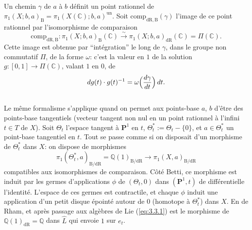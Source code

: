 \documentclass[11pt,a4paper]{article}
\theoremstyle{plain}
\theoremstyle{definition}
\newcommand{\Q}{\mathbb{Q}}
\newcommand{\C}{\mathbb{C}}
\newcommand{\dR}{\mathrm{dR}}
\newcommand{\B}{\mathrm{B}}
\newcommand{\comp}{\mathrm{comp}}
\begin{document}
\subsection{}\label{ssec:3.2}

Un chemin $\gamma$ de $a$ \`a $b$ d\'efinit un point rationnel de $\pi_1(X;b,a)_{\B} = \pi_1(X(\C);b,a)^{\mathrm{un}}$. Soit $\comp_{\dR,\B}(\gamma)$ l'image de ce point rationnel par l'isomorphisme de comparaison
\[
\comp_{\dR,\B} : \pi_1(X;b,a)_{\B}(\C) \xrightarrow{\sim} \pi_1(X;b,a)_{\dR}(\C) = \Pi(\C).
\]
Cette image est obtenue par ``int\'egration'' le long de $\gamma$, dans le groupe non commutatif $\Pi$, de la forme $\omega$: c'est la valeur en $1$ de la solution $g: [0,1] \to \Pi(\C)$, valant $1$ en $0$, de
\begin{equation}\label{eq:3.2.1}
dg(t) \cdot g(t)^{-1} = \omega\Bigl(\frac{d\gamma}{dt}\Bigr)\,dt.
\end{equation}

\subsection{}\label{ssec:3.3}

Le m\^eme formalisme s'applique quand on permet aux points-base $a$, $b$ d'\^etre des points-base tangentiels (vecteur tangent non nul en un point rationnel \`a l'infini $t \in T$ de $X$). Soit $\Theta_t$ l'espace tangent \`a $\mathbf{P}^1$ en $t$, $\Theta_t^* := \Theta_t - \{0\}$, et $a \in \Theta_t^*$ un point-base tangentiel en $t$. Tout se passe comme si on disposait d'un morphisme de $\Theta_t^*$ dans $X$: on dispose de morphismes
\begin{equation}\label{eq:3.3.1}
\pi_1(\Theta_t^*,a)_{\B/\dR} = \Q(1)_{\B/\dR} \to \pi_1(X,a)_{\B/\dR}
\end{equation}
compatibles aux isomorphismes de comparaison. C\^ot\'e Betti, ce morphisme est induit par les germes d'applications $\phi$ de $(\Theta_t,0)$ dans $(\mathbf{P}^1,t)$ de diff\'erentielle l'identit\'e. L'espace de ces germes est contractile, et chaque $\phi$ induit une application d'un petit disque \'epoint\'e autour de $0$ (homotope \`a $\Theta_t^*$) dans $X$. En de Rham, et apr\`es passage aux alg\`ebres de Lie (\ref{eq:3.3.1}) est le morphisme de $\Q(1)_{\dR} = \Q$ dans $\hat{L}$ qui envoie $1$ sur $e_t$.

\subsection{}\label{ssec:3.4}
\end{document}
